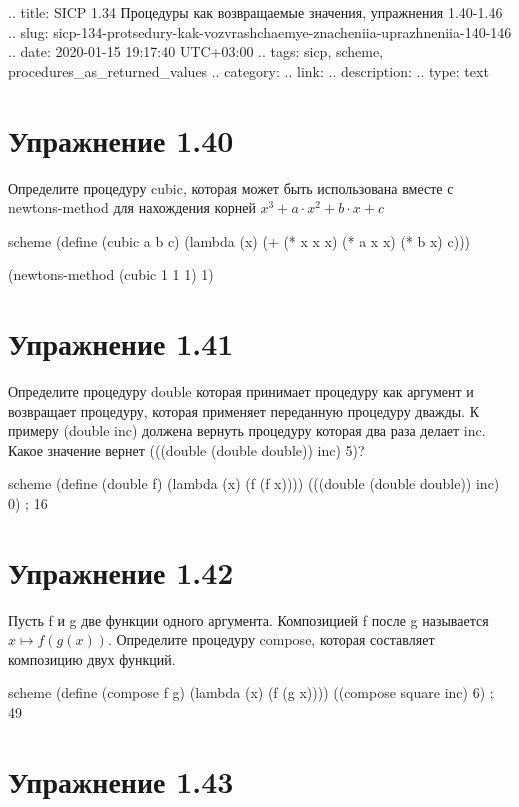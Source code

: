 .. title: SICP 1.34 Процедуры как возвращаемые значения, упражнения 1.40-1.46
.. slug: sicp-134-protsedury-kak-vozvrashchaemye-znacheniia-uprazhneniia-140-146
.. date: 2020-01-15 19:17:40 UTC+03:00
.. tags: sicp, scheme, procedures_as_returned_values
.. category: 
.. link: 
.. description: 
.. type: text

\chapter{Упражнение 1.40}

Определите процедуру cubic, которая может быть использована вместе с newtons-method для нахождения корней $x^3+a\cdot x^2+b\cdot x+c$


\begin{codelisting}{scheme}
(define (cubic a b c)
  (lambda (x)
    (+ (* x x x) (* a x x) (* b x) c)))

(newtons-method (cubic 1 1 1) 1)
\end{codelisting}

\chapter{Упражнение 1.41}

Определите процедуру double которая принимает процедуру как аргумент и возвращает процедуру, которая применяет переданную процедуру дважды. К примеру (double inc) должена вернуть процедуру которая два раза делает inc. Какое значение вернет (((double (double double)) inc) 5)?


\begin{codelisting}{scheme}
(define (double f)
  (lambda (x)
    (f (f x))))
(((double (double double)) inc) 0) ; 16
\end{codelisting}

\chapter{Упражнение 1.42}

Пусть f и g две функции одного аргумента. Композицией f после g называется $x\mapsto f(g(x))$. Определите процедуру compose, которая составляет композицию двух функций.

\begin{codelisting}{scheme}
(define (compose f g)
  (lambda (x) (f (g x))))
((compose square inc) 6) ; 49
\end{codelisting}

\chapter{Упражнение 1.43}

